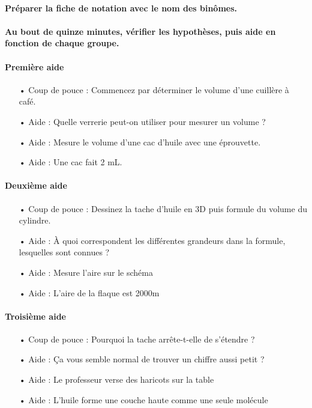 \documentclass[12pt,a4paper]{article}
\begin{document}
\paragraph{Préparer la fiche de notation avec le nom des binômes.}

\paragraph{Au bout de quinze minutes, vérifier les hypothèses, puis aide en fonction de chaque groupe.}

\paragraph{Première aide}
\begin{itemize}
\item[•] Coup de pouce : Commencez par déterminer le volume d'une cuillère à café.
\item[•] Aide : Quelle verrerie peut-on utiliser pour mesurer un volume ?
\item[•] Aide : Mesure le volume d'une cac d'huile avec une éprouvette.
\item[•] Aide : Une cac fait 2 mL.
\end{itemize}

\paragraph{Deuxième aide}
\begin{itemize}
\item[•] Coup de pouce : Dessinez la tache d'huile en 3D puis formule du volume du cylindre.
\item[•] Aide : À quoi correspondent les différentes grandeurs dans la formule, lesquelles sont connues ?
\item[•] Aide : Mesure l'aire sur le schéma
\item[•] Aide : L'aire de la flaque est \unit{2000}{m\squared}
\end{itemize}

\paragraph{Troisième aide}
\begin{itemize}
\item[•] Coup de pouce : Pourquoi la tache arrête-t-elle de s'étendre ?
\item[•] Aide : Ça vous semble normal de trouver un chiffre aussi petit ?
\item[•] Aide : Le professeur verse des haricots sur la table
\item[•] Aide : L'huile forme une couche haute comme une seule molécule
\end{itemize}
\end{document}
